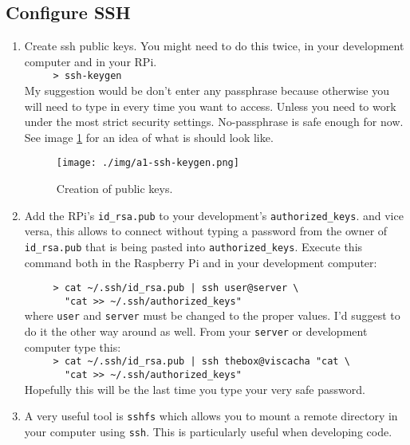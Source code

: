      \subsection{Configure SSH}
     \begin{enumerate}
   \item Create ssh public keys. You might need to do this twice, in your development computer and in your RPi.\\   
         \verb=     > ssh-keygen=\\
     My suggestion would be don't enter any passphrase because otherwise you will need to
     type in every time you want to access. Unless you need to work under the most strict security settings. No-passphrase is safe enough for now.
   See image \ref{fig:a1-ssh-keygen} for an idea of what is should look like.
     
     \begin{figure}[h!]
 \centering
 \texttt{[image: ./img/a1-ssh-keygen.png]}
 \caption{Creation of public keys.}
 \label{fig:a1-ssh-keygen}
\end{figure}

    \item Add the RPi's \verb=id_rsa.pub= to your development's \verb=authorized_keys=. and vice versa, this allows to connect without typing a password from the owner of
    \verb=id_rsa.pub= that is being pasted into \verb=authorized_keys=. Execute this command both in the Raspberry Pi and in your development computer:
    
 	\verb=     > cat ~/.ssh/id_rsa.pub | ssh user@server \=\\
 	\verb=       "cat >> ~/.ssh/authorized_keys"=\\
     where \verb=user= and \verb=server= must be changed to the proper values. I'd suggest to do it the other way around as well. From your \verb=server= or development
     computer type this:\\
     \verb=     > cat ~/.ssh/id_rsa.pub | ssh thebox@viscacha "cat \=\\
     \verb=       "cat >> ~/.ssh/authorized_keys"=\\
     Hopefully this will be the last time you type your very safe password.
     \item A very useful tool is \verb=sshfs= which allows you to mount a remote directory in your computer using \verb=ssh=. This is particularly useful when developing code.
 \end{enumerate}
 

